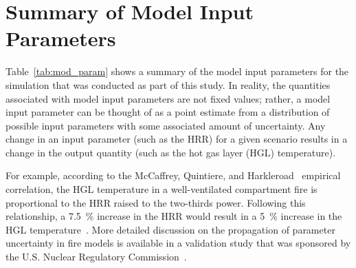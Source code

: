 \documentclass[12pt,oneside]{book}
\begin{document}
\clearpage

\section{Summary of Model Input Parameters}
\label{sec:summary_of_model_inputs}

Table~\ref{tab:mod_param} shows a summary of the model input parameters for the simulation that was conducted as part of this study. In reality, the quantities associated with model input parameters are not fixed values; rather, a model input parameter can be thought of as a point estimate from a distribution of possible input parameters with some associated amount of uncertainty. Any change in an input parameter (such as the HRR) for a given scenario results in a change in the output quantity (such as the hot gas layer (HGL) temperature).

For example, according to the McCaffrey, Quintiere, and Harkleroad~\cite{SFPE:Walton} empirical correlation, the HGL temperature in a well-ventilated compartment fire is proportional to the HRR raised to the two-thirds power. Following this relationship, a 7.5~\% increase in the HRR would result in a 5~\% increase in the HGL temperature~\cite{NUREG_1824_Sup_1}. More detailed discussion on the propagation of parameter uncertainty in fire models is available in a validation study that was sponsored by the U.S. Nuclear Regulatory Commission~\cite{NUREG_1824_Sup_1}.
\end{document}
